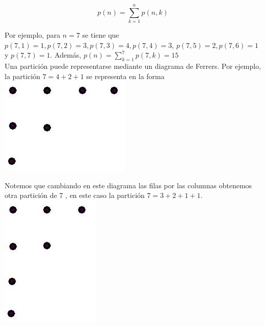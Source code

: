 \documentclass[10pt]{article}
\begin{document}
$$
p(n)=\sum_{k=1}^{n} p(n, k)
$$

Por ejemplo, para $n=7$ se tiene que $p(7,1)=1, p(7,2)=3, p(7,3)=4, p(7,4)=3$, $p(7,5)=2, p(7,6)=1$ y $p(7,7)=1$. Además, $p(n)=\sum_{k=1}^{7} p(7, k)=15$\\
Una partición puede representarse mediante un diagrama de Ferrers. Por ejemplo, la partición $7=4+2+1$ se representa en la forma\\
\includegraphics[max width=\textwidth, center]{2025_09_05_3ba26226ec0baddb5a03g-31}

Notemos que cambiando en este diagrama las filas por las columnas obtenemos otra partición de 7 , en este caso la partición $7=3+2+1+1$.\\
\includegraphics[max width=\textwidth, center]{2025_09_05_3ba26226ec0baddb5a03g-31(1)}
\end{document}

